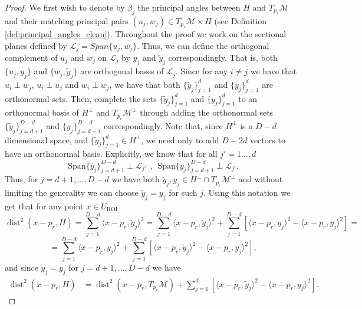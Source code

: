 \documentclass[12pt]{article}
\theoremstyle{remark}
\newcommand{\MM}{\mathcal{M}}
\newcommand{\LL}{\mathcal{L}}
\newcommand{\dist}{\operatorname{dist}}
\newcommand{\wtilde}[1]{\widetilde{#1}}
\newcommand{\lrangle}[1]{\langle #1 \rangle}
\begin{document}
\begin{appendices}
\begin{proof}
We first wish to denote by $\beta_j$ the principal angles between $H$ and $T_{p_r}\MM$ and their matching principal pairs $(u_j, w_j)\in T_{p_r}\MM\times H$ (see Definition \ref{def:principal_angles_clean}).  
Throughout the proof we work on the sectional planes defined by $\LL_j = Span\{u_j,w_j\}$.
Thus, we can define the orthogonal complement of $u_j$ and $w_j$ on $\LL_j$ by $y_j$ and $\tilde y_j$ correspondingly.
That is, both $\{u_j, y_j\}$ and $\{w_j, \tilde y_j\}$ are orthogonal bases of $\LL_j$.
Since for any $i \neq j$ we have that $u_i \perp w_j$, $u_i \perp u_j$ and $w_i \perp w_j$, we have that both $\{\tilde y_j\}_{j=1}^{d}$ and $\{y_j\}_{j=1}^{d}$ are orthonormal sets.
Then, complete the sets $\{\tilde y_j\}_{j=1}^{d}$ and $\{y_j\}_{j=1}^{d}$  to an orthonormal basis of $H^\perp$  and $T_{p_r}\MM^\perp$ through adding the orthonormal sets $\{\tilde y_j\}_{j=d+1}^{D-d}$ and $\{y_j\}_{j=d+1}^{D-d}$ correspondingly. Note that, since $H^\perp$ is a $D-d$ dimensional space, and $\{\wtilde y_j\}_{j=1}^{d} \in H^\perp$, we need only to add $D-2d$ vectors to have an orthonormal basis.
Explicitly, we know that for all $j' = 1\ldots, d$
$$\textrm{Span}\{\tilde y_j\}_{j=d+1}^{D-d}\perp \LL_{j'} ~~,~~ \textrm{Span}\{ y_j\}_{j=d+1}^{D-d}\perp \LL_{j'}.$$ 
Thus, for $j=d+1, \ldots, D-d$ we have both $\tilde y_j , y_j\in H^\perp \cap T_{p_r}\MM^\perp$ and without limiting the generality we can choose $\tilde y_j = y_j$ for such $j$.
Using this notation we get that for any point $x\in U_\textrm{ROI}$
\[
\dist^2(x - {p_r}, H) = 
\sum_{j=1}^{D-d} \lrangle{x - {p_r}, \tilde y_j}^2 =
\sum_{j=1}^{D-d} \lrangle{x - {p_r}, \tilde y_j}^2 + \sum_{j=1}^{D-d} \left[\lrangle{x - {p_r},  y_j}^2 - \lrangle{x - {p_r},  y_j}^2\right] =
\]
\[
=\sum_{j=1}^{D-d} \lrangle{x - {p_r}, y_j}^2 + \sum_{j=1}^{D-d}\left[ \lrangle{x - {p_r},  \tilde y_j}^2 - \lrangle{x - {p_r},  y_j}^2\right]
,\]
and since $\tilde y_j = y_j$ for $j=d+1,\ldots,D-d$ we have
\begin{align}\label{eq:EJ_1_clean}
	\dist^2(x - {p_r}, H) &=
	\dist^2(x - {p_r}, T_{{p_r}}\MM) + \sum_{j=1}^{d}\left[ \langle x - {p_r}, \tilde{y}_j \rangle^2 - \langle x - {p_r}, {y}_j \rangle^2\right]
.\end{align}


\end{proof}
\end{appendices}
\end{document}
